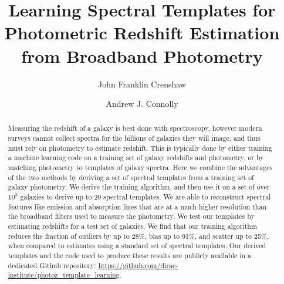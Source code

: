 \documentclass[twocolumn]{aastex63}
\begin{document}
 


\title{Learning Spectral Templates for Photometric Redshift Estimation \\ from Broadband Photometry}


\author[0000-0002-2495-3514]{John Franklin Crenshaw}

\author[0000-0001-5576-8189]{Andrew J. Connolly}


\begin{abstract}
    Measuring the redshift of a galaxy is best done with spectroscopy, however modern surveys cannot collect spectra for the billions of galaxies they will image, and thus must rely on photometry to estimate redshift.
    This is typically done by either training a machine learning code on a training set of galaxy redshifts and photometry, or by matching photometry to templates of galaxy spectra.
    Here we combine the advantages of the two methods by deriving a set of spectral templates from a training set of galaxy photometry.
    We derive the training algorithm, and then use it on a set of over $10^5$ galaxies to derive up to 20 spectral templates.
    We are able to reconstruct spectral features like emission and absorption lines that are at a much higher resolution than the broadband filters used to measure the photometry.
    We test our templates by estimating redshifts for a test set of galaxies.
    We find that our training algorithm reduces the fraction of outliers by up to 28\%, bias up to 91\%, and scatter up to 25\%, when compared to estimates using a standard set of spectral templates.
    Our derived templates and the code used to produce these results are publicly available in a dedicated Github repository: \url{https://github.com/dirac-institute/photoz_template_learning}.
\end{abstract}
\end{document}
